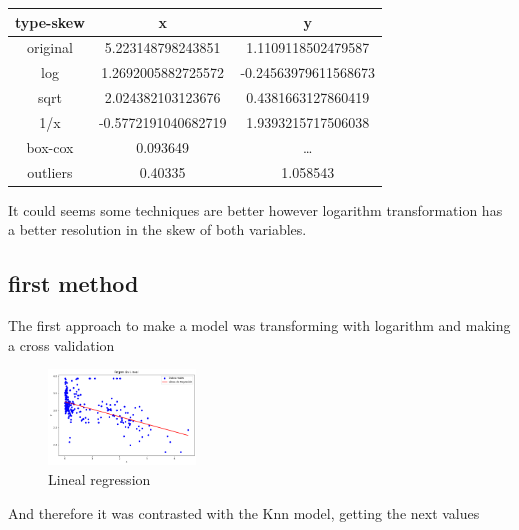 \documentclass{article}
\begin{document}
\begin{center}
  \begin{tabular}{|c|c|c|}
    \hline
     type-skew & x & y  \\ \hline
     original& 5.223148798243851&1.1109118502479587\\
     log&1.2692005882725572&-0.24563979611568673\\
     sqrt&2.024382103123676&0.4381663127860419\\
     1/x&-0.5772191040682719&1.9393215717506038\\
     box-cox&0.093649&\dots\\
     outliers&0.40335&1.058543\\
      \hline
  \end{tabular}
\end{center}
It could seems some techniques are better however logarithm transformation has a better resolution in the skew of both variables.    
\subsection{first method}
The first approach to make a model was transforming with logarithm and making a cross validation
\begin{figure}[h]
  \centering
  \includegraphics[width=0.35\textwidth]{model_1.png}
  \caption{Lineal regression}
  \label{fig:example_1}
\end{figure}
And therefore it was contrasted with the Knn model, getting the next values
\end{document}
